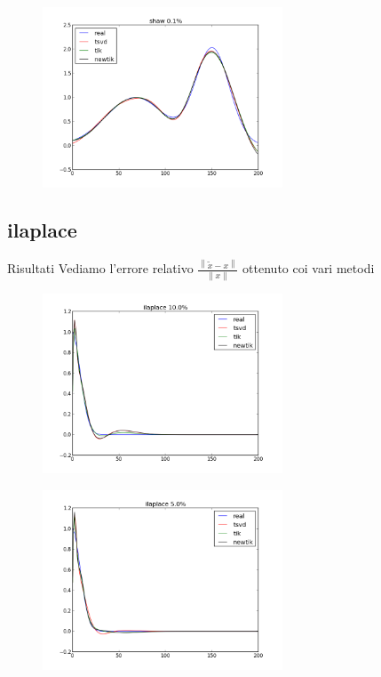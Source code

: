 \documentclass{beamer}
\theoremstyle{plain}
\theoremstyle{definition}
\theoremstyle{remark}
\newcommand{\norm}[1]{\left\|#1\right\|}
\begin{document}
\begin{frame}
  \begin{figure}
    \centering
    \includegraphics[keepaspectratio,width=270px]{shaw_1.png}
  \end{figure}
\end{frame}


\subsection{ilaplace}

\begin{frame}{Risultati}
  Vediamo l'errore relativo $\frac{\norm{\tilde x - x}}{\norm{x}}$
  ottenuto coi vari metodi
  \begin{center}
    
  \end{center}
\end{frame}

\begin{frame}
  \begin{figure}
    \centering
    \includegraphics[keepaspectratio,width=270px]{ilaplace_100.png}
  \end{figure}
\end{frame}

\begin{frame}
  \begin{figure}
    \centering
    \includegraphics[keepaspectratio,width=270px]{ilaplace_50.png}
  \end{figure}
\end{frame}
\end{document}
